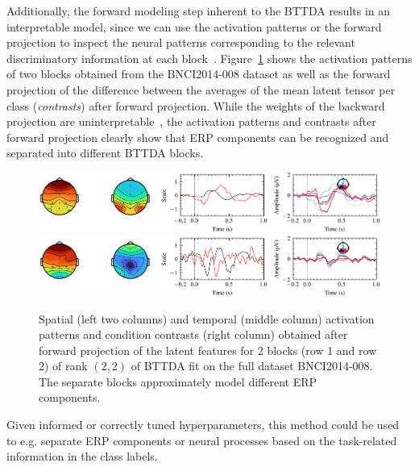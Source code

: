 Additionally, the forward modeling step inherent to the BTTDA results
in an interpretable model, since we can use the activation patterns or the
forward projection to inspect the neural patterns corresponding to the
relevant discriminatory information at each block~\cite{Haufe2014}.
Figure~\ref{fig:forward} shows the activation patterns
of two blocks obtained from the BNCI2014-008 dataset as well as the forward
projection of the difference between the averages of the mean latent tensor per
class (\emph{contrasts}) after forward projection.
While the weights of the backward projection are
uninterpretable~\cite{Haufe2014},
the activation patterns and contrasts after forward projection clearly show
that ERP components can be recognized and separated into different
BTTDA blocks.
\begin{figure}[t]
	\includegraphics[width=\linewidth]{figures/bttda/forward_block-0.png}
	\includegraphics[width=\linewidth]{figures/bttda/forward_block-1.png}
	\caption{Spatial (left two columns) and temporal (middle column) activation patterns and
		condition contrasts (right column) obtained after forward projection of the latent
		features for 2 blocks (row 1 and row 2) of rank $(2,2)$ of BTTDA
		fit on the full dataset BNCI2014-008.
		The separate blocks approximately model different ERP
		components.}
	\label{fig:forward}
\end{figure}
Given informed or correctly tuned hyperparameters, this method could be used to
e.g. separate ERP components or neural processes based on the task-related
information in the class labels.


